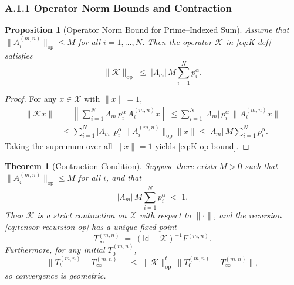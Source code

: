 \documentclass[11pt]{article}
\newtheorem{theorem}{Theorem}
\newtheorem{proposition}{Proposition}
\begin{document}
\subsubsection*{A.1.1 Operator Norm Bounds and Contraction}

\begin{proposition}[Operator Norm Bound for Prime–Indexed Sum]
Assume that $\|A^{(m,n)}_i\|_{\mathrm{op}} \leq M$ for all $i = 1,\dots,N$. Then the operator $\mathcal{K}$ in \eqref{eq:K-def} satisfies
\begin{equation}
  \|\mathcal{K}\|_{\mathrm{op}}
  \;\leq\;
  |\Lambda_m|\,M \sum_{i=1}^N p_i^{\alpha}.
  \label{eq:K-op-bound}
\end{equation}
\end{proposition}

\begin{proof}
For any $x \in \mathcal{X}$ with $\|x\|=1$,
\begin{align}
  \|\mathcal{K}x\|
  &= \left\| \sum_{i=1}^N \Lambda_m\, p_i^{\alpha}\, A^{(m,n)}_i x \right\|
   \leq \sum_{i=1}^N |\Lambda_m|\, p_i^{\alpha}\, \|A^{(m,n)}_i x\| \\
  &\leq \sum_{i=1}^N |\Lambda_m|\, p_i^{\alpha}\, \|A^{(m,n)}_i\|_{\mathrm{op}} \|x\|
   \leq |\Lambda_m|\, M \sum_{i=1}^N p_i^{\alpha}.
\end{align}
Taking the supremum over all $\|x\|=1$ yields \eqref{eq:K-op-bound}.
\end{proof}

\begin{theorem}[Contraction Condition]\label{thm:contraction}
Suppose there exists $M>0$ such that $\|A^{(m,n)}_i\|_{\mathrm{op}} \leq M$ for all $i$, and that
\begin{equation}
  |\Lambda_m|\,M \sum_{i=1}^N p_i^{\alpha} \;<\; 1.
  \label{eq:K-op-contraction}
\end{equation}
Then $\mathcal{K}$ is a strict contraction on $\mathcal{X}$ with respect to $\|\cdot\|$, and the recursion \eqref{eq:tensor-recursion-op} has a unique fixed point
\begin{equation}
  T_\infty^{(m,n)} \;=\; (\mathsf{Id} - \mathcal{K})^{-1} F^{(m,n)}.
\end{equation}
Furthermore, for any initial $T_0^{(m,n)}$,
\begin{equation}
  \|T_t^{(m,n)} - T_\infty^{(m,n)}\|
  \;\leq\;
  \|\mathcal{K}\|_{\mathrm{op}}^t \,\|T_0^{(m,n)} - T_\infty^{(m,n)}\|,
\end{equation}
so convergence is geometric.
\end{theorem}
\end{document}
